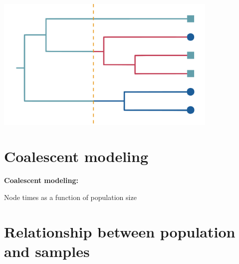 \documentclass[aspectratio=169]{beamer}
\begin{document}
\begin{frame} \frametitle{\insertsection}

    \begin{center}

        \centering\includegraphics[width=0.8\textwidth]{images/tree-option3}

    \end{center}

\end{frame}


\section{Coalescent modeling}

\begin{frame} 
    \begin{center}
        \begin{huge}
    
            \textbf{Coalescent modeling:}

            Node times as a function of population size

        \end{huge}
    \end{center}
\end{frame}

\section{Relationship between population and samples}
\end{document}
